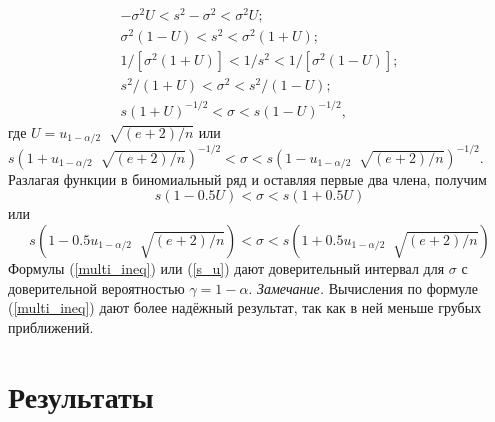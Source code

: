 \documentclass[a4paper]{article}
\begin{document}
    \begin{equation}
        \begin{split}
            -\sigma^{2}U < s^{2} -\sigma^{2} < \sigma^{2}U; \\
           \sigma^{2}(1-U) < s^{2} < \sigma^{2}(1 + U); \\
            1/[\sigma^{2}(1 + U)] < 1/s^{2} < 1/[\sigma^{2}(1-U)];\\
            s^{2}/(1 + U) < \sigma^{2} < s^{2}/(1-U);\\
            s(1 + U)^{-1/2} < \sigma < s(1-U)^{-1/2},
        \end{split}
        \label{multi_ineq}
    \end{equation}
    где $U = u_{1-\alpha/2}︀\sqrt{(e + 2)/n}$ или
    \newline
    $s(1 +  u_{1-\alpha/2}︀\sqrt{(e + 2)/n})^{-1/2} <\sigma < s(1-u_{1-\alpha/2}︀\sqrt{(e + 2)/n})^{-1/2}$.
    \newline
    Разлагая функции в биномиальный ряд и оставляя первые два члена, получим
    $$
        s(1-0.5U) < \sigma < s(1 + 0.5U)
        \label{s_U}
    $$
     или
    \begin{equation}
        s(1-0.5u_{1-\alpha/2}︀\sqrt{(e + 2)/n}) < \sigma < s(1 + 0.5 u_{1-\alpha/2}︀\sqrt{(e + 2)/n})
        \label{s_u}
    \end{equation}
    Формулы (\ref{multi_ineq}) или (\ref{s_u}) дают доверительный интервал для $\sigma$ с доверительной вероятностью $\gamma = 1-\alpha$. 
    \newline
    \textit{Замечание.} Вычисления по формуле (\ref{multi_ineq}) дают более надёжный результат, так как в ней меньше грубых приближений.
\section{Результаты}
\end{document}
